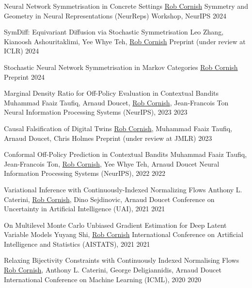 \documentclass[9pt]{developercv} %
\begin{document}
\begin{entrylist}
    \publication
        {Neural Network Symmetrisation in Concrete Settings}
        {\underline{Rob Cornish}}
        {Symmetry and Geometry in Neural Representations (NeurReps) Workshop, NeurIPS}
        {2024}

    \publication
        {SymDiff: Equivariant Diffusion via Stochastic Symmetrisation}
        {Leo Zhang, Kianoosh Ashouritaklimi, Yee Whye Teh, \underline{Rob Cornish}}
        {Preprint (under review at ICLR)}
        {2024}

    \publication
        {Stochastic Neural Network Symmetrisation in Markov Categories}
        {\underline{Rob Cornish}}
        {Preprint}
        {2024}

    \publication
        {Marginal Density Ratio for Off-Policy Evaluation in Contextual Bandits}
        {Muhammad Faaiz Taufiq, Arnaud Doucet, \underline{Rob Cornish}, Jean-Francois Ton}
        {Neural Information Processing Systems (NeurIPS), 2023}
        {2023}

    \publication
        {Causal Falsification of Digital Twins}
        {\underline{Rob Cornish}, Muhammad Faaiz Taufiq, Arnaud Doucet, Chris Holmes}
        {Preprint (under review at JMLR)}
        {2023}

    \publication
        {Conformal Off-Policy Prediction in Contextual Bandits}
        {Muhammad Faaiz Taufiq, Jean-Francois Ton, \underline{Rob Cornish}, Yee Whye Teh, Arnaud Doucet}
        {Neural Information Processing Systems (NeurIPS), 2022}
        {2022}

    \publication
        {Variational Inference with Continuously-Indexed Normalizing Flows}
        {Anthony L. Caterini, \underline{Rob Cornish}, Dino Sejdinovic, Arnaud Doucet}
        {Conference on Uncertainty in Artificial Intelligence (UAI), 2021}
        {2021}

    \publication
        {On Multilevel Monte Carlo Unbiased Gradient Estimation for Deep Latent Variable Models}
        {Yuyang Shi, \underline{Rob Cornish}}
        {International Conference on Artificial Intelligence and Statistics (AISTATS), 2021}
        {2021}


    \publication
        {Relaxing Bijectivity Constraints with Continuously Indexed Normalising Flows}
        {\underline{Rob Cornish}, Anthony L. Caterini, George Deligiannidis, Arnaud Doucet}
        {International Conference on Machine Learning (ICML), 2020}
        {2020}


\end{entrylist}
\end{document}
